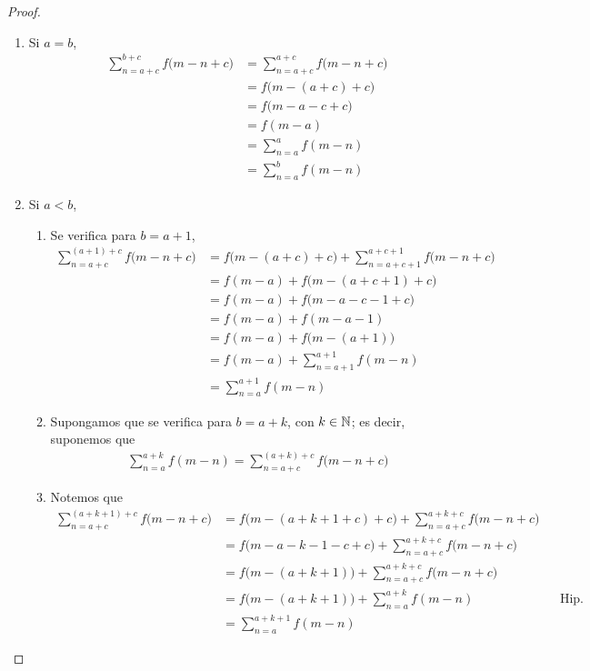 \begin{enumerate}[label=\alph*)]
\begin{proof}
\begin{enumerate}[label=\roman*)]
    \item Si $a=b$,
    \begin{align*}
      \sum_{n=a+c}^{b+c} f\bigl(m-n+c\bigr) &= \sum_{n=a+c}^{a+c} f\bigl(m-n+c\bigr)\\
      &= f\bigl(m-(a+c)+c\bigr)\\
      &= f\bigl(m-a-c+c\bigr)\\
      &= f(m-a)\\
      &= \sum_{n=a}^a f(m-n)\\
      &= \sum_{n=a}^b f(m-n)
    \end{align*}

    \item Si $a<b$,
    \begin{enumerate}[label=\roman*)]
      \item Se verifica para $b=a+1$,
      \begin{align*}
        \sum_{n=a+c}^{(a+1)+c} f\bigl(m-n+c\bigr) &= f\bigl(m-(a+c)+c\bigr) + \sum_{n=a+c+1}^{a+c+1} f\bigl(m-n+c\bigr)\\
        &= f(m-a) + f\bigl(m-(a+c+1)+c\bigr)\\
        &= f(m-a) + f\bigl(m-a-c-1+c\bigr)\\
        &= f(m-a) + f(m-a-1)\\
        &= f(m-a) + f\bigl(m-(a+1)\bigr)\\
        &= f(m-a) + \sum_{n=a+1}^{a+1} f(m-n)\\
        &= \sum_{n=a}^{a+1} f(m-n)
      \end{align*}

      \item Supongamos que se verifica para $b=a+k$, con $k\in \mathbb{N}$; es decir, suponemos que
      \begin{align*}
        \sum_{n=a}^{a+k} f(m-n) = \sum_{n=a+c}^{(a+k)+c} f\bigl(m-n+c\bigr)
      \end{align*}

      \item Notemos que
      \begin{align*}
        \sum_{n=a+c}^{(a+k+1)+c} f\bigl(m-n+c\bigr) &= f\bigl(m-(a+k+1+c)+c\bigr) + \sum_{n=a+c}^{a+k+c} f\bigl(m-n+c\bigr)\\
        &= f\bigl(m-a-k-1-c+c\bigr) + \sum_{n=a+c}^{a+k+c} f\bigl(m-n+c\bigr)\\
        &= f\bigl(m-(a+k+1)\bigr)+ \sum_{n=a+c}^{a+k+c} f\bigl(m-n+c\bigr)\\
        &= f\bigl(m-(a+k+1)\bigr) + \sum_{n=a}^{a+k} f(m-n) && \text{Hip. Ind.}\\
        &= \sum_{n=a}^{a+k+1} f(m-n)
      \end{align*}
    \end{enumerate}
  \end{enumerate}
  \end{proof}


\end{enumerate}

